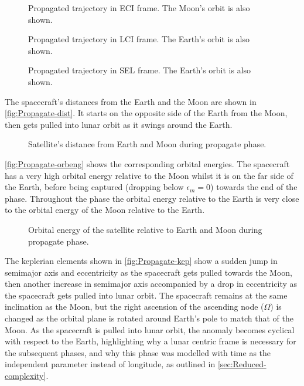 \begin{figure}
\caption{Propagated trajectory in ECI frame. The Moon's orbit is also shown.} \label{fig:Propagate-3D}
\centering
\def\svgwidth{\figurewidth}

\end{figure}

\begin{figure}
\caption{Propagated trajectory in LCI frame. The Earth's orbit is also shown.} \label{fig:Propagate-3D-lci}
\centering
\def\svgwidth{\figurewidth}

\end{figure}

\begin{figure}
\caption{Propagated trajectory in SEL frame. The Earth's orbit is also shown.} \label{fig:Propagate-3D-sel}
\centering
\def\svgwidth{\figurewidth}

\end{figure}

The spacecraft's distances from the Earth and the Moon are shown in \autoref{fig:Propagate-dist}. It starts on the opposite side of the Earth from the Moon, then gets pulled into lunar orbit as it swings around the Earth. 

\begin{figure}
\caption{Satellite's distance from Earth and Moon during propagate phase.} \label{fig:Propagate-dist}
\centering
\def\svgwidth{\figurewidth}

\end{figure}

\autoref{fig:Propagate-orbeng} shows the corresponding orbital energies. The spacecraft has a very high orbital energy relative to the Moon whilst it is on the far side of the Earth, before being captured (dropping below $\epsilon_m=0$) towards the end of the phase. Throughout the phase the orbital energy relative to the Earth is very close to the orbital energy of the Moon relative to the Earth.

\begin{figure}
\caption{Orbital energy of the satellite relative to Earth and Moon during propagate phase.} \label{fig:Propagate-orbeng}
\centering
\def\svgwidth{\figurewidth}

\end{figure}

The keplerian elements shown in \autoref{fig:Propagate-kep} show a sudden jump in semimajor axis and eccentricity as the spacecraft gets pulled towards the Moon, then another increase in semimajor axis accompanied by a drop in eccentricity as the spacecraft gets pulled into lunar orbit. The spacecraft remains at the same inclination as the Moon, but the right ascension of the ascending node ($\Omega$) is changed as the orbital plane is rotated around Earth's pole to match that of the Moon. As the spacecraft is pulled into lunar orbit, the anomaly becomes cyclical with respect to the Earth, highlighting why a lunar centric frame is necessary for the subsequent phases, and why this phase was modelled with time as the independent parameter instead of longitude, as outlined in \autoref{sec:Reduced-complexity}.

